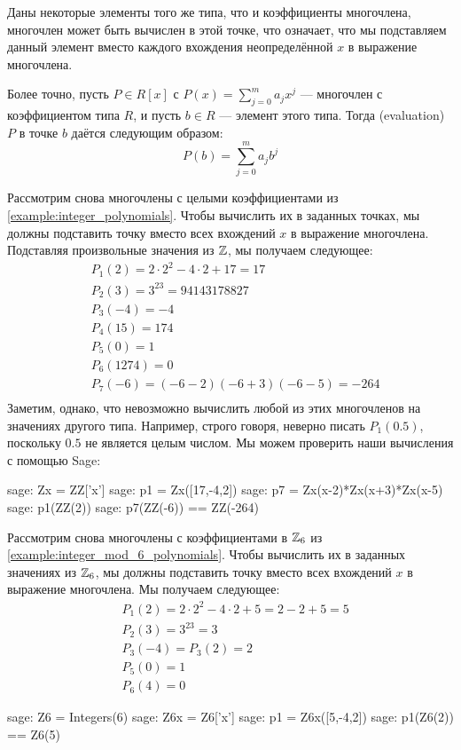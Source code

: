 Даны некоторые элементы того же типа, что и коэффициенты многочлена, многочлен может быть вычислен в этой точке, что означает, что мы подставляем данный элемент вместо каждого вхождения неопределённой $x$ в выражение многочлена.

Более точно, пусть $P\in R[x]$ с $P(x)=\sum_{j=0}^m a_j x^j$ — многочлен с коэффициентом типа $R$, и пусть $b\in R$ — элемент этого типа. Тогда  (evaluation) $P$ в точке $b$ даётся следующим образом:
\begin{equation}
P(b) = \sum_{j=0}^m a_j b^j
\end{equation}
\begin{example}Рассмотрим снова многочлены с целыми коэффициентами из \examplename{} \ref{example:integer_polynomials}. Чтобы вычислить их в заданных точках, мы должны подставить точку вместо всех вхождений $x$ в выражение многочлена. Подставляя произвольные значения из $\mathbb{Z}$, мы получаем следующее:
\begin{align*}
 &P_1(2)    = 2\cdot 2^2 -4\cdot 2 +17 = 17 \\
 &P_2(3)    = 3^{23}=94143178827 \\
 &P_3(-4)   = -4 \\
 &P_4(15)   = 174 \\
 &P_5(0)    = 1 \\
 &P_6(1274) =0 \\
 &P_7(-6)   = (-6-2)(-6+3)(-6-5) = -264 \\
\end{align*}
Заметим, однако, что невозможно вычислить любой из этих многочленов на значениях другого типа. Например, строго говоря, неверно писать $P_1(0.5)$, поскольку $0.5$ не является целым числом. Мы можем проверить наши вычисления с помощью Sage:
\begin{sagecommandline}
sage: Zx = ZZ['x']
sage: p1 = Zx([17,-4,2])
sage: p7 = Zx(x-2)*Zx(x+3)*Zx(x-5)
sage: p1(ZZ(2))
sage: p7(ZZ(-6)) == ZZ(-264)
\end{sagecommandline}

\end{example}
\begin{example} Рассмотрим снова многочлены с коэффициентами в $\mathbb{Z}_6$ из \examplename{} \ref{example:integer_mod_6_polynomials}. Чтобы вычислить их в заданных значениях из $\mathbb{Z}_6$, мы должны подставить точку вместо всех вхождений $x$ в выражение многочлена. Мы получаем следующее:
\begin{align*}
 & P_1(2)= 2\cdot 2^2 -4\cdot 2 +5 = 2 - 2 + 5 = 5\\
 &P_2(3)= 3^{23}=3\\
 &P_3(-4)= P_3(2) = 2\\
 &P_5(0)= 1\\
 &P_6(4)=0
\end{align*}
\begin{sagecommandline}
sage: Z6 = Integers(6)
sage: Z6x = Z6['x']
sage: p1 = Z6x([5,-4,2])
sage: p1(Z6(2)) == Z6(5)
\end{sagecommandline}

\end{example}
